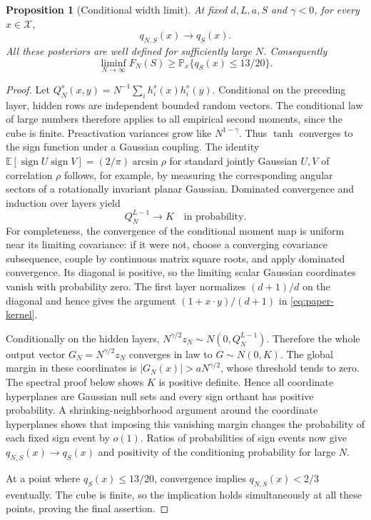 \documentclass[11pt]{article}
\newtheorem{proposition}[theorem]{Proposition}
\theoremstyle{remark}\newtheorem{remark}[theorem]{Remark}
\DeclareMathOperator{\sign}{sign}
\begin{document}
\begin{proposition}[Conditional width limit]\label{prop:paper-width}
At fixed $d,L,a,S$ and $\gamma<0$, for every $x\in\mathcal X$,
\[
 q_{N,S}(x)\longrightarrow q_S(x).
\]
All these posteriors are well defined for sufficiently large $N$.
Consequently
\[
 \liminf_{N\to\infty}F_N(S)\ge
 \mathbb P_x\{q_S(x)\le13/20\}.
\]
\end{proposition}
\begin{proof}
Let $Q_N^s(x,y)=N^{-1}\sum_i h_i^s(x)h_i^s(y)$. Conditional on
the preceding layer, hidden rows are independent bounded random vectors.
The conditional law of large numbers therefore applies to all empirical
second moments, since the cube is finite. Preactivation variances grow
like $N^{1-\gamma}$. Thus $\tanh$ converges to the sign function under
a Gaussian coupling. The identity
$\mathbb E[\sign U\sign V]=(2/\pi)\arcsin\rho$ for standard jointly
Gaussian $U,V$ of correlation $\rho$ follows, for example, by measuring
the corresponding angular sectors of a rotationally invariant planar
Gaussian. Dominated convergence and induction over layers yield
\[
 Q_N^{L-1}\longrightarrow K\quad\text{in probability}.
\]
For completeness, the convergence of the conditional moment map is
uniform near its limiting covariance: if it were not, choose a
converging covariance subsequence, couple by continuous matrix square
roots, and apply dominated convergence. Its diagonal is positive, so
the limiting scalar Gaussian coordinates vanish with probability zero.
The first layer normalizes $(d+1)/d$ on the diagonal and hence gives
the argument $(1+x\cdot y)/(d+1)$ in \eqref{eq:paper-kernel}.

Conditionally on the hidden layers,
$N^{\gamma/2}z_N\sim N(0,Q_N^{L-1})$. Therefore the whole output
vector $G_N=N^{\gamma/2}z_N$ converges in law to $G\sim N(0,K)$.
The global margin in these coordinates is
$|G_N(x)|>aN^{\gamma/2}$, whose threshold tends to zero. The spectral
proof below shows $K$ is positive definite. Hence all coordinate
hyperplanes are Gaussian null sets and every sign orthant has positive
probability. A shrinking-neighborhood argument around the coordinate
hyperplanes shows that imposing this vanishing margin changes the
probability of each fixed sign event by $o(1)$. Ratios of probabilities
of sign events now give $q_{N,S}(x)\to q_S(x)$ and positivity of the
conditioning probability for large $N$.

At a point where $q_S(x)\le13/20$, convergence implies
$q_{N,S}(x)<2/3$ eventually. The cube is finite, so the implication
holds simultaneously at all these points, proving the final assertion.
\end{proof}
\end{document}
